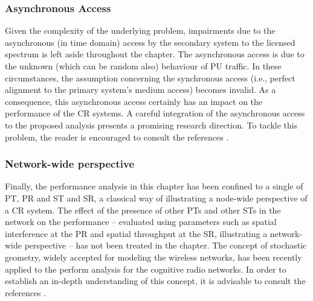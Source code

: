 {\subsubsection*{Asynchronous Access}
Given the complexity of the underlying problem, impairments due to the asynchronous (in time domain) access by the secondary system to the licensed spectrum is left aside throughout the chapter. The asynchronous access is due to the unknown (which can be random also) behaviour of PU traffic. In these circumstances, the assumption concerning the synchronous access (i.e., perfect alignment to the primary system's medium access) becomes invalid. As a consequence, this asynchronous access certainly has an impact on the performance of the CR systems. A careful integration of the asynchronous access to the proposed analysis presents a promising research direction. To tackle this problem, the reader is encouraged to consult the references \cite{Jiang13_, Jiang15}.


\subsubsection*{Network-wide perspective}
Finally, the performance analysis in this chapter has been confined to a single of PT, PR and ST and SR, a classical way of illustrating a node-wide perspective of a CR system. The effect of the presence of other PTs and other STs in the network on the performance -- evaluated using parameters such as spatial interference at the PR and spatial throughput at the SR, illustrating a network-wide perspective -- has not been treated in the chapter. The concept of stochastic geometry, widely accepted for modeling the wireless networks, has been recently applied to the perform analysis for the cognitive radio networks. In order to establish an in-depth understanding of this concept, it is advisable to consult the references \cite{Lee12, Elsawy13, Song14}.



}
